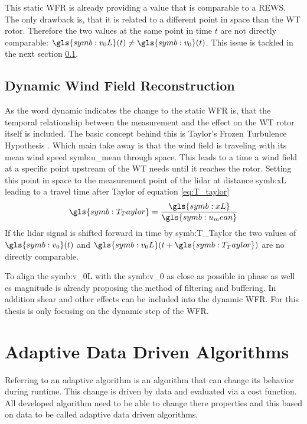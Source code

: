 \noindent This static \gls{WFR} is already providing a value that is comparable to a \gls{REWS}. The only drawback is, that it is related to a different point in space than the \gls{WT} rotor. Therefore the two values at the same point in time $t$ are not directly comparable: $\gls{symb:v_0L}(t) \neq \gls{symb:v_0}(t)$. This issue is tackled in the next section \ref{subsec:DynamicWFR}.    

\subsection{Dynamic Wind Field Reconstruction}\label{subsec:DynamicWFR}
As the word dynamic indicates the change to the static \gls{WFR} is, that the temporal relationship between the measurement and the effect on the \gls{WT} rotor itself is included. The basic concept behind this is Taylor’s Frozen Turbulence Hypothesis \cite{Taylor1938}. Which main take away is that the wind field is traveling with its mean wind speed \gls{symb:u_mean} through space. This leads to a time a wind field at a specific point upstream of the \gls{WT} needs until it reaches the rotor. Setting this point in space to the measurement point of the \gls{lidar} at distance \gls{symb:xL} leading to a travel time after Taylor of equation \ref{eq:T_taylor}
\begin{equation}
	\gls{symb:T_Taylor} =  \frac{\gls{symb:xL}}{\gls{symb:u_mean}} 
	\label{eq:T_taylor}	
\end{equation}
If the \gls{lidar} signal is shifted forward in time by \gls{symb:T_Taylor} the two values of $\gls{symb:v_0}(t)$ and $\gls{symb:v_0L}(t+\gls{symb:T_Taylor})$ are no directly comparable. 

\noindent To align the \gls{symb:v_0L} with the \gls{symb:v_0} as close as possible in phase as well es magnitude \cite{Schlipf2011} is already proposing the method of filtering and buffering. In addition shear and other effects can be included into the dynamic \gls{WFR}. For this thesis is only focusing on the dynamic step of the \gls{WFR}.

   
\section{Adaptive Data Driven Algorithms}\label{sec:AlgBasics}
Referring to \cite{Zaknich2005} an adaptive algorithm is an algorithm that can change its behavior during runtime. This change is driven by data and evaluated via a cost function. All developed algorithm need to be able to change there properties and this based on data to be called adaptive data driven algorithms. 